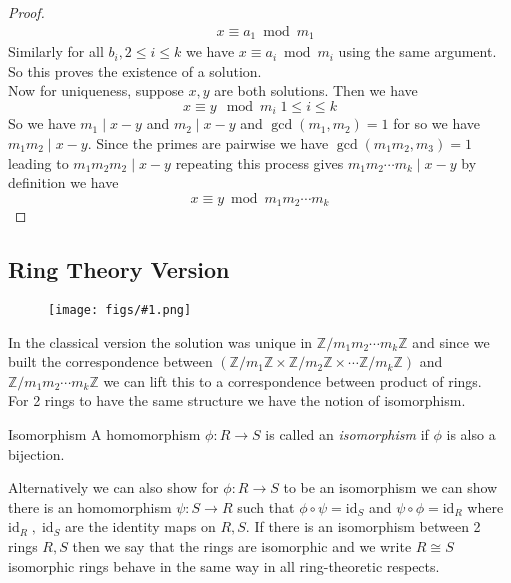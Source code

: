 \documentclass[16pt,a4paper]{article}
\theoremstyle{definition}
\newcommand{\Z}{\mathbb{Z}}
\newcommand{\fig}[2]{\begin{figure}[hbtp] 
 \centering
 \texttt{[image: figs/\#1.png]}
 \end{figure}
}
\begin{document}
\begin{proof}
\begin{align*}
&x \equiv a_1 \bmod m_1
\end{align*}
Similarly for all $b_i, 2\leq i \leq k$ we have $x \equiv a_i \bmod m_i$ using the same argument. So this proves the existence of a solution. 
\\
Now for uniqueness, suppose $x,y$ are both solutions. Then we have 
\[x\equiv y \mod m_i \; 1\leq i \leq k\]
So we have $m_1 \mid x-y$ and $m_2 \mid x-y$ and $\gcd(m_1,m_2) = 1$ for  so we have $m_1m_2\mid x-y$. Since the primes are pairwise we have $\gcd(m_1m_2,m_3) = 1$ leading to $m_1m_2m_2 \mid x-y$ repeating this process gives $m_1m_2\cdots m_k \mid x-y$ by definition we have 
\[x\equiv y \bmod m_1m_2\cdots m_k\]
\end{proof}
\subsection{Ring Theory Version}
\fig{fig2}{0.6}
In the classical version the solution was unique in $\Z/m_1m_2\cdots m_k \Z$ and since we built the correspondence between $(\Z/m_1\Z\times \Z/m_2\Z\times \cdots \Z/m_k\Z)$ and $\Z/m_1m_2\cdots m_k \Z$ we can lift this to a correspondence between product of rings.  
\\
For 2 rings to have the same structure we have the notion of isomorphism. 
\begin{defn}{Isomorphism}{}
A homomorphism $\phi: R\rightarrow S$ is called an \emph{isomorphism} if $\phi$ is also a bijection. 
\end{defn}
Alternatively we can also show for $\phi:R\rightarrow S$ to be an isomorphism we can show there is an homomorphism $\psi: S\rightarrow R$ such that $\phi\circ \psi = \mathrm{id}_S$ and $\psi \circ \phi = \mathrm{id}_R$ where $\mathrm{id}_R \; , \; \mathrm{id}_S$ are the identity maps on $R,S$. 
\newpage
If there is an isomorphism between 2 rings $R,S$ then we say that the rings are isomorphic and we write $R\cong S$ isomorphic rings behave in the same way in all ring-theoretic respects.
\end{document}
